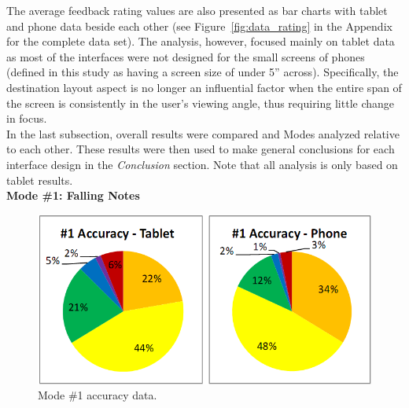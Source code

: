 \documentclass{sig-alternate}
\begin{document}
The average feedback rating values are also presented as bar charts with tablet and phone data beside each other (see Figure~\ref{fig:data_rating} in the Appendix for the complete data set). The analysis, however, focused mainly on tablet data as most of the interfaces were not designed for the small screens of phones (defined in this study as having a screen size of under 5'' across). Specifically, the destination layout aspect is no longer an influential factor when the entire span of the screen is consistently in the user's viewing angle, thus requiring little change in focus. \\

In the last subsection, overall results were compared and Modes analyzed relative to each other. These results were then used to make general conclusions for each interface design in the \textit{Conclusion} section. Note that all analysis is only based on tablet results. \\

\newpage
\noindent \textbf{Mode \#1: Falling Notes}

\begin{figure}[htb!]
	\begin{center}
		\includegraphics[width=1\linewidth]{figure_chart_accuracy_1}
	\end{center}
	\vspace{-12pt}
	\caption{Mode \#1 accuracy data.}
	\label{fig:chart_accuracy_1}
\end{figure}
\end{document}
